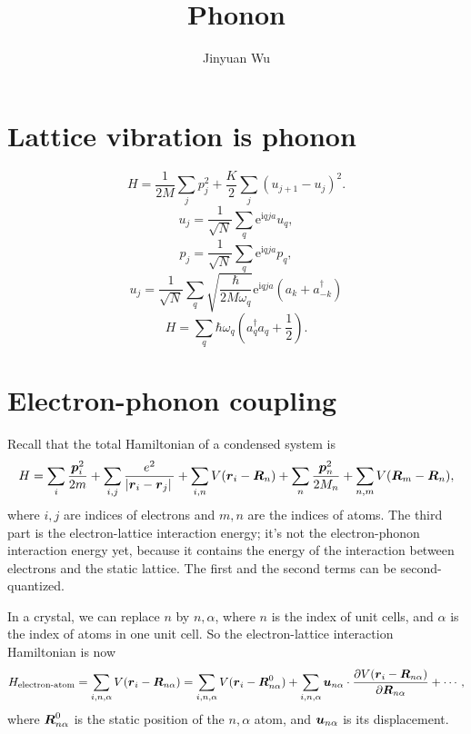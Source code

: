 \documentclass[hyperref, a4paper]{article}
\title{Phonon}
\author{Jinyuan Wu}
\newcommand*{\ii}{\mathrm{i}}
\newcommand*{\ee}{\mathrm{e}}
\begin{document}
\maketitle

\section{Lattice vibration is phonon}

\begin{equation}
    H = \frac{1}{2M} \sum_{j} {p}_j^2 + \frac{K}{2} \sum_{j} ({u}_{j+1} - {u}_j)^2.
\end{equation}
\begin{equation}
    {u}_j = \frac{1}{\sqrt{N}} \sum_q \ee^{\ii q j a} {u}_q,
\end{equation}
\begin{equation}
    {p}_j = \frac{1}{\sqrt{N}} \sum_q \ee^{\ii q j a} {p}_q,
\end{equation}
\begin{equation}
    u_j = \frac{1}{\sqrt{N}} \sum_q \sqrt{\frac{\hbar}{2 M \omega_q}} \ee^{\ii q j a}
    (a_k + a_{-k}^\dagger)
\end{equation}
\begin{equation}
    H = \sum_q \hbar \omega_q \left(
        a^\dagger_q a_q + \frac{1}{2}
    \right).
\end{equation}

\section{Electron-phonon coupling}

Recall that the total Hamiltonian of a condensed system is 
\begin{equation}
    H = \sum_{i} \frac{\vb*{p}_i^2}{2m} 
    + \sum_{i, j} \frac{e^2}{\abs*{\vb*{r}_i - \vb*{r}_j}}
    + \sum_{i, n} V(\vb*{r}_i - \vb*{R}_n)
    + \sum_{n} \frac{\vb*{p}_n^2}{2M_n}
    + \sum_{n, m} V(\vb*{R}_m - \vb*{R}_n),
\end{equation} 
where $i, j$ are indices of electrons 
and $m, n$ are the indices of atoms. 
The third part is the electron-lattice interaction energy; 
it's not the electron-phonon interaction energy yet, 
because it contains the energy of the interaction 
between electrons and the static lattice. 
The first and the second terms can be second-quantized.

In a crystal, we can replace $n$ by $n, \alpha$, 
where $n$ is the index of unit cells, 
and $\alpha$ is the index of atoms in one unit cell.
So the electron-lattice interaction Hamiltonian is now 
\begin{equation}
    H_{\text{electron-atom}} = \sum_{i, n, \alpha} V(\vb*{r}_i - \vb*{R}_{n \alpha})
    = \sum_{i, n, \alpha} V(\vb*{r}_i - \vb*{R}_{n \alpha}^0)
    + \sum_{i, n, \alpha} \vb*{u}_{n \alpha} \cdot \pdv{V(\vb*{r}_i - \vb*{R}_{n \alpha})}{\vb*{R}_{n \alpha}}
    + \cdots,
\end{equation}
where $\vb*{R}^0_{n \alpha}$ is the static position of the $n, \alpha$ atom, 
and $\vb*{u}_{n \alpha}$ is its displacement.
\end{document}
